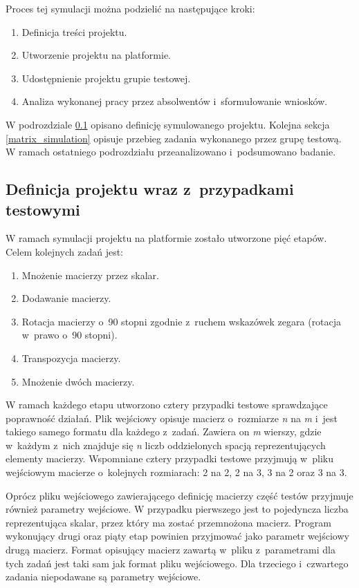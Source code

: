 Proces tej symulacji można podzielić na następujące kroki:
\begin{enumerate}
    \item Definicja treści projektu.
    \item Utworzenie projektu na platformie.
    \item Udostępnienie projektu grupie testowej.
    \item Analiza wykonanej pracy przez absolwentów i~sformułowanie wniosków.
\end{enumerate}

W podrozdziale \ref{matrix_project_definition} opisano definicję symulowanego projektu.
Kolejna sekcja \ref{matrix_simulation} opisuje przebieg zadania wykonanego przez grupę testową.
W ramach ostatniego podrozdziału przeanalizowano i~podsumowano badanie.


\subsection{Definicja projektu wraz z~przypadkami testowymi}
\label{matrix_project_definition}

W ramach symulacji projektu na platformie zostało utworzone pięć etapów.
Celem kolejnych zadań jest:
\begin{enumerate}
    \item Mnożenie macierzy przez skalar.
    \item Dodawanie macierzy.
    \item Rotacja macierzy o~90 stopni zgodnie z~ruchem wskazówek zegara (rotacja w~prawo o~90 stopni).
    \item Transpozycja macierzy.
    \item Mnożenie dwóch macierzy.
\end{enumerate}

W ramach każdego etapu utworzono cztery przypadki testowe sprawdzające poprawność działań.
Plik wejściowy opisuje macierz o~rozmiarze \textit{n} na \textit{m} i~jest takiego samego formatu dla każdego z~zadań.
Zawiera on \textit{m} wierszy, gdzie w~każdym z~nich znajduje się \textit{n} liczb oddzielonych spacją reprezentujących elementy macierzy.
Wspomniane cztery przypadki testowe przyjmują w~pliku wejściowym macierze o~kolejnych rozmiarach: 2 na 2, 2 na 3, 3 na 2 oraz 3 na 3.

Oprócz pliku wejściowego zawierającego definicję macierzy część testów przyjmuje również parametry wejściowe.
W przypadku pierwszego jest to pojedyncza liczba reprezentująca skalar, przez który ma zostać przemnożona macierz.
Program wykonujący drugi oraz piąty etap powinien przyjmować jako parametr wejściowy drugą macierz.
Format opisujący macierz zawartą w~pliku z~parametrami dla tych zadań jest taki sam jak format pliku wejściowego.
Dla trzeciego i~czwartego zadania niepodawane są parametry wejściowe.


